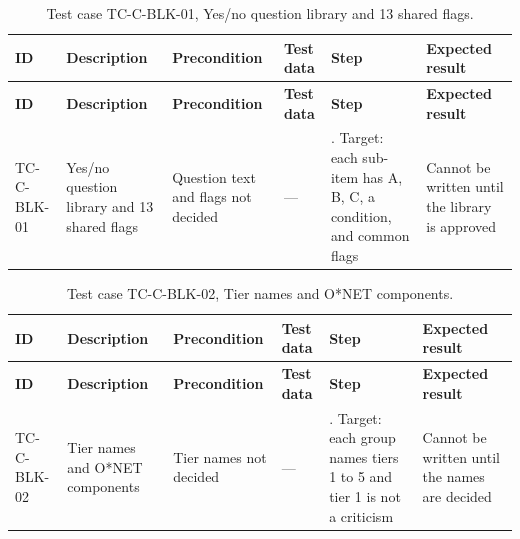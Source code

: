 {\footnotesize{}\renewcommand{\arraystretch}{1.1}
\begin{longtable}{|>{\raggedright\arraybackslash}p{}|>{\raggedright\arraybackslash}p{}|>{\raggedright\arraybackslash}p{}|>{\raggedright\arraybackslash}p{}|>{\raggedright\arraybackslash}p{}|>{\raggedright\arraybackslash}p{}|}
\caption{Test case TC-\allowbreak{}C-\allowbreak{}BLK-\allowbreak{}01, Yes/no question library and 13 shared flags.} \\
\hline
\textbf{ID} & \textbf{Description} & \textbf{Precondition} & \textbf{Test data} & \textbf{Step} & \textbf{Expected result} \\ \hline
\endfirsthead
\hline
\textbf{ID} & \textbf{Description} & \textbf{Precondition} & \textbf{Test data} & \textbf{Step} & \textbf{Expected result} \\ \hline
\endhead
TC-C-BLK-01 & Yes/no question library and 13 shared flags & Question text and flags not decided & --- & 1. Target: each sub-item has A, B, C, a condition, and common flags & Cannot be written until the library is approved \\ \hline
\end{longtable}
}

{\footnotesize{}\renewcommand{\arraystretch}{1.1}
\begin{longtable}{|>{\raggedright\arraybackslash}p{}|>{\raggedright\arraybackslash}p{}|>{\raggedright\arraybackslash}p{}|>{\raggedright\arraybackslash}p{}|>{\raggedright\arraybackslash}p{}|>{\raggedright\arraybackslash}p{}|}
\caption{Test case TC-\allowbreak{}C-\allowbreak{}BLK-\allowbreak{}02, Tier names and O*NET components.} \\
\hline
\textbf{ID} & \textbf{Description} & \textbf{Precondition} & \textbf{Test data} & \textbf{Step} & \textbf{Expected result} \\ \hline
\endfirsthead
\hline
\textbf{ID} & \textbf{Description} & \textbf{Precondition} & \textbf{Test data} & \textbf{Step} & \textbf{Expected result} \\ \hline
\endhead
TC-C-BLK-02 & Tier names and O*NET components & Tier names not decided & --- & 1. Target: each group names tiers 1 to 5 and tier 1 is not a criticism & Cannot be written until the names are decided \\ \hline
\end{longtable}
}

